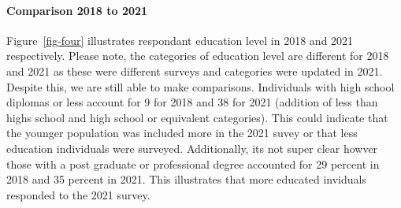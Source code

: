 \documentclass[
  letterpaper,
  DIV=11,
  numbers=noendperiod]{scrartcl}
\let\oldparagraph\paragraph
\renewcommand{\paragraph}[1]{\oldparagraph{#1}\mbox{}}
\begin{document}
\paragraph{Comparison 2018 to 2021}\label{comparison-2018-to-2021-1}

Figure~\ref{fig-four} illustrates respondant education level in 2018 and
2021 respectively. Please note, the categories of education level are
different for 2018 and 2021 as these were different surveys and
categories were updated in 2021. Despite this, we are still able to make
comparisons. Individuals with high school diplomas or less account for 9
for 2018 and 38 for 2021 (addition of less than highs school and high
school or equivalent categories). This could indicate that the younger
population was included more in the 2021 suvey or that less education
individuals were surveyed. Additionally, its not super clear howver
those with a post graduate or professional degree accounted for 29
percent in 2018 and 35 percent in 2021. This illustrates that more
educated inviduals responded to the 2021 survey.
\end{document}

